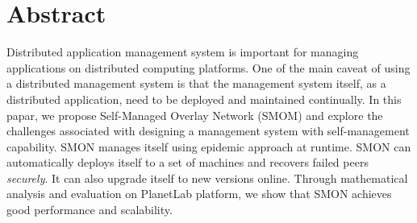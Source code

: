 \section*{Abstract}

Distributed application management system is important for
managing applications on distributed computing platforms. 
One of the main caveat of using a distributed management
system is that the management system itself, as a
distributed application, need to be deployed and maintained
continually.  In this papar, we propose Self-Managed Overlay
Network (SMOM) and explore the challenges associated with
designing a management system with self-management
capability. SMON manages itself using epidemic approach at
runtime. SMON can automatically deploys itself to a set of
machines and recovers failed peers \emph{securely}. It can
also upgrade itself to new versions online. Through
mathematical analysis and evaluation on PlanetLab platform,
we show that SMON achieves good performance and scalability.

